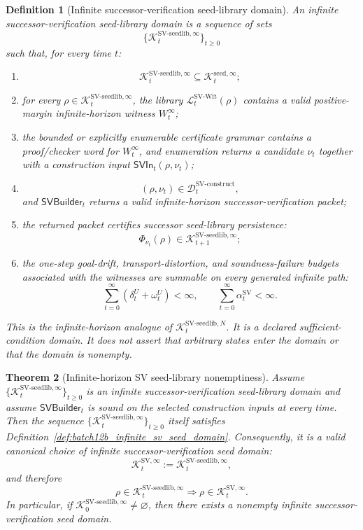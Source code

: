 \documentclass[11pt]{article}
\newtheorem{theorem}{Theorem}[section]
\newtheorem{definition}[theorem]{Definition}
\newcommand{\Lcal}{\mathcal{L}}
\newcommand{\1}{\mathbf{1}}
\providecommand{\Dcal}{\mathcal{D}}
\providecommand{\Kcal}{\mathcal{K}}
\begin{document}
\begin{definition}[Infinite successor-verification seed-library domain]
\label{def:batch12b_infinite_sv_seed_library_domain}
An infinite successor-verification seed-library domain is a sequence of sets
\[
\{\Kcal_t^{\mathrm{SV\mbox{-}seedlib},\infty}\}_{t\ge0}
\]
such that, for every time \(t\):
\begin{enumerate}[label=(\roman*),leftmargin=1.5em]
    \item
    \[
    \Kcal_t^{\mathrm{SV\mbox{-}seedlib},\infty}
    \subseteq
    \Kcal_t^{\mathrm{seed},\infty};
    \]
    \item for every \(\rho\in\Kcal_t^{\mathrm{SV\mbox{-}seedlib},\infty}\), the library \(\Lcal_t^{\mathrm{SV\mbox{-}Wit}}(\rho)\) contains a valid positive-margin infinite-horizon witness \(W_t^\infty\);
    \item the bounded or explicitly enumerable certificate grammar contains a proof/checker word for \(W_t^\infty\), and enumeration returns a candidate \(\nu_t\) together with a construction input \(\mathsf{SVIn}_t(\rho,\nu_t)\);
    \item
    \[
    (\rho,\nu_t)\in\Dcal_t^{\mathrm{SV\mbox{-}construct}},
    \]
    and \(\mathsf{SVBuilder}_t\) returns a valid infinite-horizon successor-verification packet;
    \item the returned packet certifies successor seed-library persistence:
    \[
    \Phi_{\nu_t}(\rho)
    \in
    \Kcal_{t+1}^{\mathrm{SV\mbox{-}seedlib},\infty};
    \]
    \item the one-step goal-drift, transport-distortion, and soundness-failure budgets associated with the witnesses are summable on every generated infinite path:
    \[
    \sum_{t=0}^{\infty}(\delta_t^U+\omega_t^U)<\infty,
    \qquad
    \sum_{t=0}^{\infty}\alpha_t^{\mathrm{SV}}<\infty.
    \]
\end{enumerate}
This is the infinite-horizon analogue of \(\Kcal_t^{\mathrm{SV\mbox{-}seedlib},N}\).  It is a declared sufficient-condition domain.  It does not assert that arbitrary states enter the domain or that the domain is nonempty.
\end{definition}

\begin{theorem}[Infinite-horizon SV seed-library nonemptiness]
\label{thm:batch12b_infinite_sv_seed_library_nonemptiness}
Assume \(\{\Kcal_t^{\mathrm{SV\mbox{-}seedlib},\infty}\}_{t\ge0}\) is an infinite successor-verification seed-library domain and assume \(\mathsf{SVBuilder}_t\) is sound on the selected construction inputs at every time.  Then the sequence \(\{\Kcal_t^{\mathrm{SV\mbox{-}seedlib},\infty}\}_{t\ge0}\) itself satisfies Definition~\ref{def:batch12b_infinite_sv_seed_domain}.  Consequently, it is a valid canonical choice of infinite successor-verification seed domain:
\[
\Kcal_t^{\mathrm{SV},\infty}
:=
\Kcal_t^{\mathrm{SV\mbox{-}seedlib},\infty},
\]
and therefore
\[
\rho\in\Kcal_t^{\mathrm{SV\mbox{-}seedlib},\infty}
\Longrightarrow
\rho\in\Kcal_t^{\mathrm{SV},\infty}.
\]
In particular, if \(\Kcal_0^{\mathrm{SV\mbox{-}seedlib},\infty}\neq\varnothing\), then there exists a nonempty infinite successor-verification seed domain.
\end{theorem}
\end{document}
